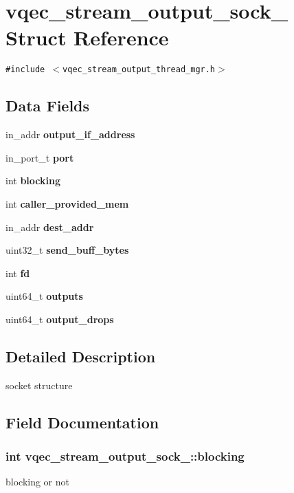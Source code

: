 \section{vqec\_\-stream\_\-output\_\-sock\_\- Struct Reference}
\label{structvqec__stream__output__sock__}
{\tt \#include $<$vqec\_\-stream\_\-output\_\-thread\_\-mgr.h$>$}

\subsection*{Data Fields}
\begin{CompactItemize}
\item 
in\_\-addr \bf{output\_\-if\_\-address}
\item 
in\_\-port\_\-t \bf{port}
\item 
int \bf{blocking}
\item 
int \bf{caller\_\-provided\_\-mem}
\item 
in\_\-addr \bf{dest\_\-addr}
\item 
uint32\_\-t \bf{send\_\-buff\_\-bytes}
\item 
int \bf{fd}
\item 
uint64\_\-t \bf{outputs}
\item 
uint64\_\-t \bf{output\_\-drops}
\end{CompactItemize}


\subsection{Detailed Description}
socket structure 



\subsection{Field Documentation}
\subsubsection{\setlength{\rightskip}{0pt plus 5cm}int \bf{vqec\_\-stream\_\-output\_\-sock\_\-::blocking}}\label{structvqec__stream__output__sock___6ad8e19a78b54b69ede04c7aa678c631}


blocking or not 
